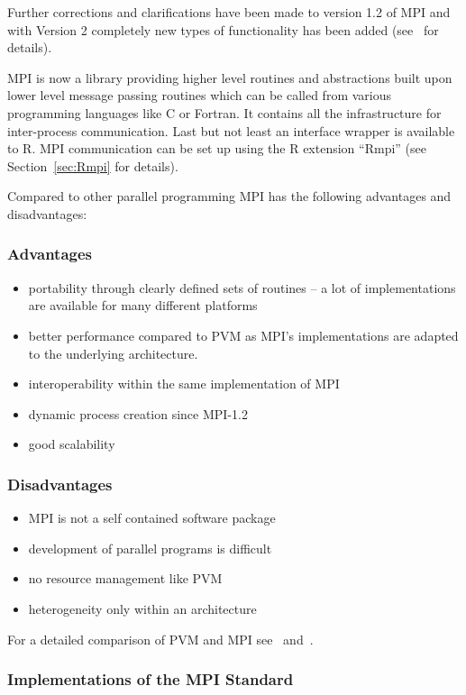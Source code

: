 Further corrections and clarifications have been made to version 1.2 of
MPI and with Version 2 completely new types of functionality has been
added (see~\cite{forum94:MPI-2} for details).

MPI is now a library providing higher level
routines and abstractions built upon lower level message passing
routines which can be called from various programming
languages like C or Fortran. It contains all the infrastructure for
inter-process communication. Last but not least an interface wrapper
is available to R. MPI communication can be set up using the R extension
``Rmpi'' (see Section~\ref{sec:Rmpi} for details).


Compared to other parallel programming MPI has the following
advantages and disadvantages:

\subsubsection{Advantages}
\begin{itemize}
\item portability through clearly defined sets of routines -- a lot of
  implementations are available for many different platforms
\item better performance compared to PVM as MPI's implementations are
  adapted to the underlying architecture.
\item interoperability within the same implementation of MPI
\item dynamic process creation since MPI-1.2
\item good scalability
\end{itemize} 

\subsubsection{Disadvantages}
\begin{itemize}
\item MPI is not a self contained software package
\item development of parallel programs is difficult
\item no resource management like PVM 
\item heterogeneity only within an architecture
\end{itemize}


For a detailed comparison of PVM and MPI see~\cite{geist96pam}
and~\cite{gropp02ggd}.

\subsubsection{Implementations of the MPI Standard}
\label{sec:mpi-implementations}

